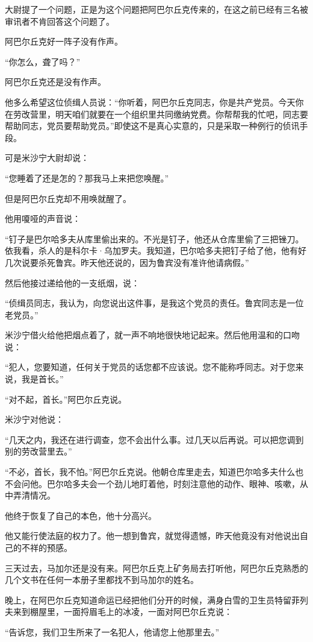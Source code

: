 大尉提了一个问题，正是为这个问题把阿巴尔丘克传来的，在这之前已经有三名被审讯者不肯回答这个问题了。

阿巴尔丘克好一阵子没有作声。

“你怎么，聋了吗？”

阿巴尔丘克还是没有作声。

他多么希望这位侦缉人员说：“你听着，阿巴尔丘克同志，你是共产党员。今天你在劳改营里，明天咱们就要在一个组织里共同缴纳党费。你帮帮我的忙吧，同志要帮助同志，党员要帮助党员。”即使这不是真心实意的，只是采取一种例行的侦讯手段。

可是米沙宁大尉却说：

“您睡着了还是怎的？那我马上来把您唤醒。”

但是阿巴尔丘克却不用唤就醒了。

他用嗄哑的声音说：

“钉子是巴尔哈多夫从库里偷出来的。不光是钉子，他还从仓库里偷了三把锉刀。依我看，杀人的是科尔卡·乌加罗夫。我知道，巴尔哈多夫把钉子给了他，他有好几次说要杀死鲁宾。昨天他还说的，因为鲁宾没有准许他请病假。”

然后他接过递给他的一支纸烟，说：

“侦缉员同志，我认为，向您说出这件事，是我这个党员的责任。鲁宾同志是一位老党员。”

米沙宁借火给他把烟点着了，就一声不响地很快地记起来。然后他用温和的口吻说：

“犯人，您要知道，任何关于党员的话您都不应该说。您不能称呼同志。对于您来说，我是首长。”

“对不起，首长。”阿巴尔丘克说。

米沙宁对他说：

“几天之内，我还在进行调查，您不会出什么事。过几天以后再说。可以把您调到别的劳改营里去。”

“不必，首长，我不怕。”阿巴尔丘克说。他朝仓库里走去，知道巴尔哈多夫什么也不会问他。巴尔哈多夫会一个劲儿地盯着他，时刻注意他的动作、眼神、咳嗽，从中弄清情况。

他终于恢复了自己的本色，他十分高兴。

他又能行使法庭的权力了。他一想到鲁宾，就觉得遗憾，昨天他竟没有对他说出自己的不祥的预感。

三天过去，马加尔还是没有来。阿巴尔丘克上矿务局去打听他，阿巴尔丘克熟悉的几个文书在任何一本册子里都找不到马加尔的姓名。

晚上，在阿巴尔丘克知道命运已经把他们分开的时候，满身白雪的卫生员特留菲列夫来到棚屋里，一面捋眉毛上的冰凌，一面对阿巴尔丘克说：

“告诉您，我们卫生所来了一名犯人，他请您上他那里去。”

